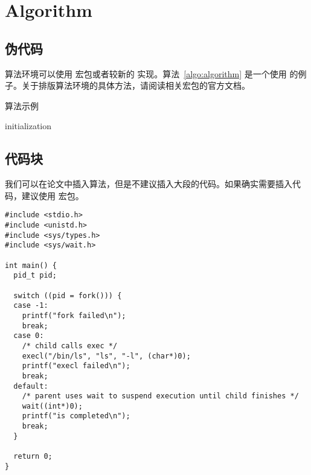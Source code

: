 
\clearpage

\section{Algorithm}

\subsection{伪代码}

算法环境可以使用  宏包或者较新的  实现。算法~\ref{algo:algorithm} 是一个使用  的例子。关于排版算法环境的具体方法，请阅读相关宏包的官方文档。

\begin{algorithm}[htb]
  \caption{算法示例}
  \label{algo:algorithm}
  \small
  \SetAlgoLined

  initialization\;
\end{algorithm}


\subsection{代码块}

我们可以在论文中插入算法，但是不建议插入大段的代码。如果确实需要插入代码，建议使用  宏包。

\lstset{language=C}
\begin{lstlisting}
#include <stdio.h>
#include <unistd.h>
#include <sys/types.h>
#include <sys/wait.h>

int main() {
  pid_t pid;

  switch ((pid = fork())) {
  case -1:
    printf("fork failed\n");
    break;
  case 0:
    /* child calls exec */
    execl("/bin/ls", "ls", "-l", (char*)0);
    printf("execl failed\n");
    break;
  default:
    /* parent uses wait to suspend execution until child finishes */
    wait((int*)0);
    printf("is completed\n");
    break;
  }

  return 0;
}
\end{lstlisting}